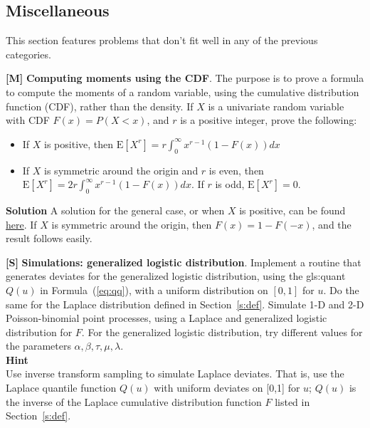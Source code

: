 \documentclass[10pt]{article}
\begin{document}
\subsection{Miscellaneous}

This section features problems that don't fit well in any of the previous categories. 

\begin{Exercise} \label{exercise5} {\bf [M]} 
{\bf Computing moments using the CDF}. The purpose is to prove a formula to compute the moments of a random variable, using the cumulative distribution function (CDF), rather than the density. If $X$ is a univariate random variable with CDF $F(x)=P(X<x)$, and $r$ is a positive integer, prove the following:
\begin{itemize}
\item If $X$ is positive, then $\mbox{E}[X^r]=r\int_0^\infty x^{r-1}(1-F(x))dx$
\item If $X$ is symmetric around the origin and $r$ is even, then $\mbox{E}[X^r]=2r\int_0^\infty x^{r-1} (1-F(x))dx$. If $r$ is odd, $\mbox{E}[X^r]=0$.
\end{itemize}
{\bf Solution} A solution for the general case, or when $X$ is positive, can be found \href{https://math.stackexchange.com/questions/1260157/moments-of-a-random-variable-in-terms-of-its-cumulative-distribution-function}{here}. If $X$ is symmetric around the origin, then $F(x)=1-F(-x)$, and the result follows easily. 
\end{Exercise}

\begin{Exercise}\label{exercise10}
{\bf [S]} {\bf Simulations: generalized logistic distribution}. Implement a routine that generates deviates for the \textcolor{index}{generalized logistic distribution}, using the \gls{gls:quant} $Q(u)$ in Formula~(\ref{eq:qq}), with a uniform distribution on $[0,1]$ for $u$. Do the same for the 
\textcolor{index}{Laplace distribution} 
defined in Section~\ref{s:def}. Simulate 1-D and 2-D Poisson-binomial point processes, using a Laplace and generalized logistic distribution for $F$. For the generalized logistic distribution, try different values for the parameters $\alpha,\beta,\tau,\mu,\lambda$. \vspace{1ex}   \\ 
{\bf Hint} \vspace{1ex}   \\ 
Use \textcolor{index}{inverse transform sampling} to simulate Laplace deviates. That is, use the Laplace quantile function $Q(u)$ with uniform deviates on [0,1] for $u$; $Q(u)$ is the inverse of the Laplace cumulative distribution function $F$ listed in Section~\ref{s:def}.
\end{Exercise} 
\end{document}
